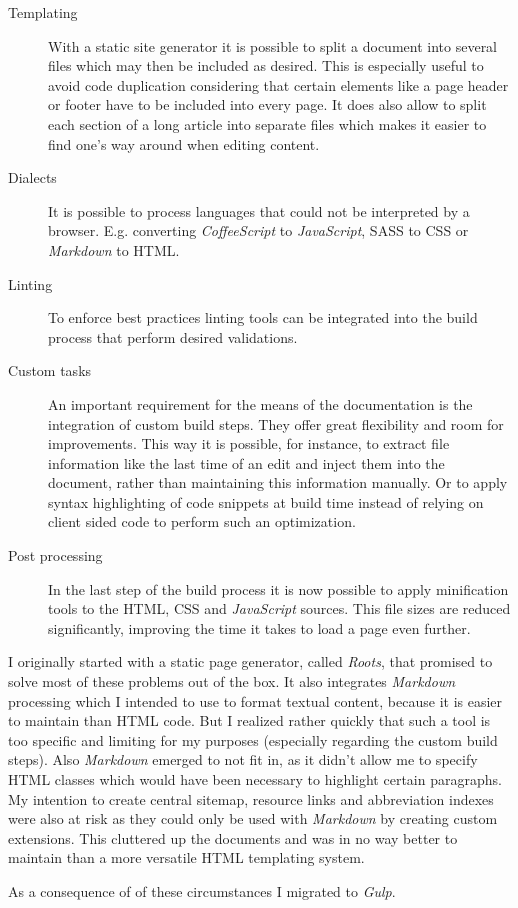 \begin{description}

	\item[Templating]\hfill

	With a static site generator it is possible to split a document into several files which may then be included as desired. This is especially useful to avoid code duplication considering that certain elements like a page header or footer have to be included into every page. It does also allow to split each section of a long article into separate files which makes it easier to find one's way around when editing content.

	\item[Dialects]\hfill

	It is possible to process languages that could not be interpreted by a browser. E.g. converting \textit{CoffeeScript} to \textit{JavaScript}, \ac{SASS} to \ac{CSS} or \textit{Markdown} to \ac{HTML}.

	\item[Linting]\hfill

	To enforce best practices linting tools can be integrated into the build process that perform desired validations.

	\item[Custom tasks]\hfill

	An important requirement for the means of the documentation is the integration of custom build steps. They offer great flexibility and room for improvements. This way it is possible, for instance, to extract file information like the last time of an edit and inject them into the document, rather than maintaining this information manually. Or to apply syntax highlighting of code snippets at build time instead of relying on client sided code to perform such an optimization.

	\item[Post processing]\hfill

	In the last step of the build process it is now possible to apply minification tools to the \ac{HTML}, \ac{CSS} and \textit{JavaScript} sources. This file sizes are reduced significantly, improving the time it takes to load a page even further.

\end{description}

I originally started with a static page generator, called \textit{Roots}, that promised to solve most of these problems out of the box. It also integrates \textit{Markdown} processing which I intended to use to format textual content, because it is easier to maintain than \ac{HTML} code. But I realized rather quickly that such a tool is too specific and limiting for my purposes (especially regarding the custom build steps). Also \textit{Markdown} emerged to not fit in, as it didn't allow me to specify \ac{HTML} classes which would have been necessary to highlight certain paragraphs. My intention to create central sitemap, resource links and abbreviation indexes were also at risk as they could only be used with \textit{Markdown} by creating custom extensions. This cluttered up the documents and was in no way better to maintain than a more versatile \ac{HTML} templating system.

As a consequence of of these circumstances I migrated to \textit{Gulp}.